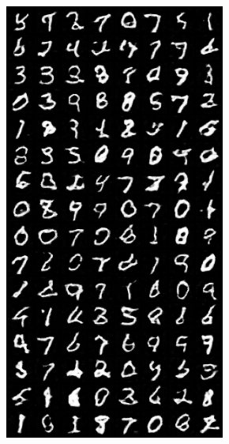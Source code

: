 \begin{figure}[H]
\begin{subfigure}{0.2\textwidth}
        \includegraphics[width=0.95\linewidth]{GAN/fake_sample_epoch_0004.png}
        \caption{}
        \label{subfig:GAN/fake_sample_epoch_0004}
    \end{subfigure}%
    \begin{subfigure}{0.2\textwidth}
        \centering

\end{subfigure}
\end{figure}

